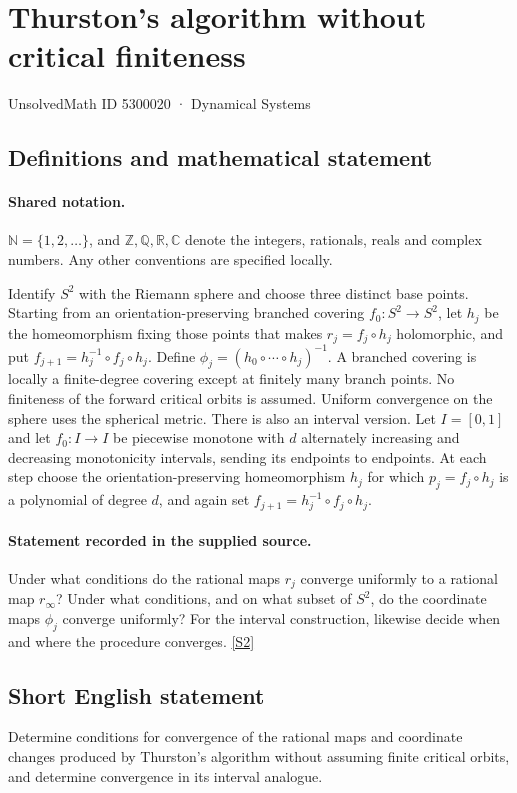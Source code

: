 \documentclass[11pt]{article}
\newcommand{\sref}[2]{\hyperlink{source:#1:#2}{[S#2]}}
\begin{document}
\setcounter{section}{5300019}
\section{Thurston's algorithm without critical finiteness}\label{5300020}
{\small\sffamily UnsolvedMath ID 5300020 · Dynamical Systems}
\subsection{Definitions and mathematical statement}

\paragraph{Shared notation.}$\mathbb N=\{1,2,\ldots\}$, and $\mathbb Z,\mathbb Q,\mathbb R,\mathbb C$ denote the integers, rationals, reals and complex numbers. Any other conventions are specified locally.


Identify $S^2$ with the Riemann sphere and choose three distinct base points. Starting from an orientation-preserving branched covering $f_0:S^2\to S^2$, let $h_j$ be the homeomorphism fixing those points that makes $r_j=f_j\circ h_j$ holomorphic, and put $f_{j+1}=h_j^{-1}\circ f_j\circ h_j$. Define $\phi_j=(h_0\circ\cdots\circ h_j)^{-1}$. A branched covering is locally a finite-degree covering except at finitely many branch points. No finiteness of the forward critical orbits is assumed. Uniform convergence on the sphere uses the spherical metric.
There is also an interval version. Let $I=[0,1]$ and let $f_0:I\to I$ be piecewise monotone with $d$ alternately increasing and decreasing monotonicity intervals, sending its endpoints to endpoints. At each step choose the orientation-preserving homeomorphism $h_j$ for which $p_j=f_j\circ h_j$ is a polynomial of degree $d$, and again set $f_{j+1}=h_j^{-1}\circ f_j\circ h_j$.
\paragraph{Statement recorded in the supplied source.}
Under what conditions do the rational maps $r_j$ converge uniformly to a rational map $r_\infty$? Under what conditions, and on what subset of $S^2$, do the coordinate maps $\phi_j$ converge uniformly? For the interval construction, likewise decide when and where the procedure converges. \sref{5300020}{2}
\subsection{Short English statement}
Determine conditions for convergence of the rational maps and coordinate changes produced by Thurston’s algorithm without assuming finite critical orbits, and determine convergence in its interval analogue.
\end{document}
